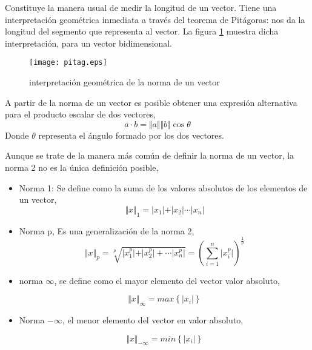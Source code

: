 Constituye la manera usual de medir la longitud de un vector. Tiene una interpretación geométrica inmediata a través del teorema de Pitágoras: nos da la longitud del segmento que representa al vector. La figura \ref{fig:pitag} muestra dicha interpretación, para un vector bidimensional.  

\begin{figure}[h]
\centering
\texttt{[image: pitag.eps]}
\caption{interpretación geométrica de la norma de un vector}
\label{fig:pitag}
\end{figure}

A partir de la norma de un vector es posible obtener una expresión alternativa para el producto escalar de dos vectores,
\begin{equation*}
a\cdot b=\Vert a \Vert \Vert b \Vert \cos \theta
\end{equation*}
Donde $\theta$ representa el ángulo formado por los dos vectores.

Aunque se trate de la manera más común de definir la norma de un vector, la norma 2 no es la única definición posible,

\begin{itemize}
\item Norma 1: Se define como la suma de los valores absolutos de los elementos de un vector,
\begin{equation*}
\Vert x \Vert_1 =\vert x_1\vert +\vert x_2 \vert\cdots \vert x_n\vert
\end{equation*}
\item Norma p, Es una generalización de la norma 2,
\begin{equation*}
\Vert x \Vert_p =\sqrt[p]{\vert x_1^p\vert+\vert x_2^p\vert+\cdots \vert x_n^p\vert}=\left( \sum_{i=1}^n\vert x_i^p \vert \right)^\frac{1}{p}
\end{equation*}
\item norma $\infty$, se define como el mayor elemento del vector valor absoluto,

\begin{equation*}
\Vert x \Vert_\infty =max \left\lbrace \vert x_i\vert\right \rbrace 
\end{equation*}

\item Norma $-\infty$, el menor elemento del vector en valor absoluto,
 
\begin{equation*}
\Vert x \Vert_{-\infty} =min \left\lbrace \vert x_i\vert\right \rbrace 
\end{equation*}
\end{itemize}

